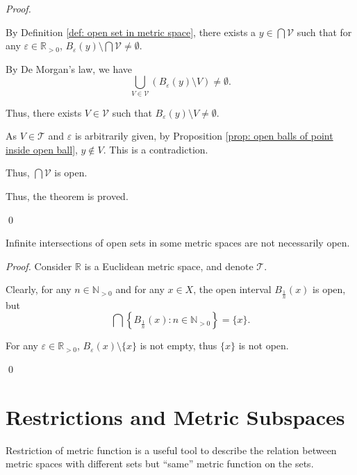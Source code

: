 \begin{proposition}
\begin{proof}
\begin{enumerate}[\bf O1.]
				By Definition \ref{def: open set in metric space}, there exists a $y \in \bigcap \mathcal V$ such that for any $\varepsilon \in \mathbb R_{> 0}$, $B_\varepsilon(y) \setminus \bigcap \mathcal V \ne \emptyset$.
				
				By De Morgan's law, we have
				$$
				\bigcup_{V \in \mathcal V}(B_\varepsilon (y) \setminus V) \ne \emptyset.
				$$
				
				Thus, there exists $V \in \mathcal V$ such that $B_\varepsilon (y) \setminus V \ne \emptyset$.
				
				As $V \in \mathcal T$ and $\varepsilon$ is arbitrarily given, by Proposition \ref{prop: open balls of point inside open ball}, $y \notin V$. This is a contradiction.
				
				Thus, $\bigcap \mathcal V$ is open.
				
				\qedlm
		\end{enumerate}
		
		Thus, the theorem is proved.
		
		\qed
	\end{proof}
\end{proposition}


\begin{proposition}
	Infinite intersections of open sets in some metric spaces are not necessarily open.
	
	\begin{proof}
		Consider $\mathbb R$ is a Euclidean metric space, and denote $\mathcal T$.
		
		Clearly, for any $n \in \mathbb N_{> 0}$ and for any $x \in X$, the open interval $B_{\frac{1}{n}}(x)$ is open, but
		$$
		\bigcap\left\{ B_{\frac{1}{n}}\left( x \right) : n \in \mathbb N_{> 0} \right\} = \{ x \} .
		$$
		
		For any $\varepsilon \in \mathbb R_{> 0}$, $B_\varepsilon(x) \setminus \{x\}$ is not empty, thus $\{x\}$ is not open.
		
		\qed
	\end{proof}
\end{proposition}


\section{Restrictions and Metric Subspaces}


Restriction of metric function is a useful tool to describe the relation between metric spaces with different sets but ``same'' metric function on the sets.

